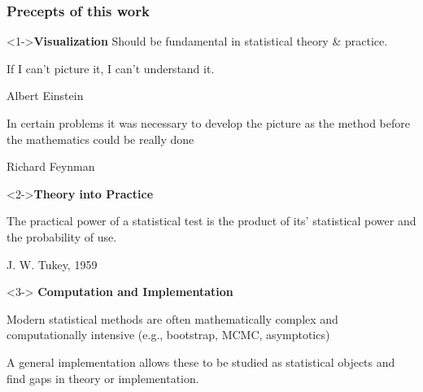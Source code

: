 \begin{frame}
  \frametitle{Precepts of this work}

  \begin{block}<1->{\textbf{Visualization}} Should be fundamental in statistical theory \&
	practice.
	\epigraph{If I can't picture it, I can't understand it.}{Albert Einstein}
	\epigraph{In certain problems it was necessary to  
	develop the \alert{picture as the method} before the mathematics 
	could be really done}{Richard Feynman}
	\end{block}

	\begin{block}<2->{\textbf{Theory into Practice}}
	\epigraph{The \alert{practical power} of a statistical test is the product
	of its' statistical power and the probability of use.}
	{J. W. Tukey, 1959\nocite{Tukey:59}}
	\end{block}

	
	\begin{block}<3->{ \textbf{Computation and Implementation}}
	 \begin{itemize*}
	  \item Modern statistical methods are often 
	  mathematically complex and 
	  computationally intensive (e.g., bootstrap, MCMC, asymptotics)
	  \item A general implementation allows these to be \alert{studied as statistical
	  objects} and \alert{find gaps} in theory or implementation.
	\end{itemize*}
  \end{block}

\end{frame}
